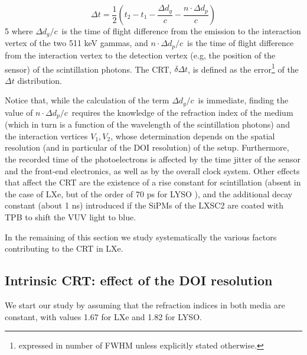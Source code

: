 \documentclass[review]{elsarticle}
\begin{document}
\begin{equation}
\Delta t = \frac{1}{2}(t_2 - t_1 - \frac{\Delta d_g}{c} - \frac{n \cdot \Delta d_p}{c}) 
\label{eq.CRT}
\end{equation}
%
5
where $\Delta d_g/c$~is the time of flight difference from the emission to the interaction vertex of the two 511 keV gammas, and $n \cdot \Delta d_p/c$~is the time of flight difference from the interaction vertex to the
detection vertex (e.g, the position of the sensor) of the scintillation photons. The CRT,
$\delta \Delta t$, is defined as the error\footnote{expressed in number of FWHM unless explicitly stated otherwise.} of the $\Delta t$ distribution. 

Notice that, while the calculation of the term $\Delta d_g/c$~is immediate, finding the value
of $n \cdot \Delta d_p/c$~requires the knowledge of the refraction index of the medium (which in turn is a function of the wavelength of the scintillation photons) and the interaction vertices $V_1,V_2$, whose determination depends on the spatial resolution (and in particular of the DOI resolution) of the setup. Furthermore, the recorded time of the photoelectrons is affected by the time jitter of the sensor and the front-end electronics, as well as by the overall clock system. Other effects that affect the CRT are the existence of a rise constant for scintillation (absent in the case of LXe, but of the order of 70 ps for LYSO \cite{Seifert}), and the additional decay constant (about 1 ns) introduced if the SiPMs of the LXSC2 are coated with TPB to shift the VUV light to blue. 

In the remaining of this section we study systematically the various factors contributing to the CRT in LXe. 

\subsection*{Intrinsic CRT: effect of the DOI resolution}
We start our study by assuming that the refraction indices in both media are constant, with values 1.67 for LXe and 
1.82 for LYSO. 
\end{document}
